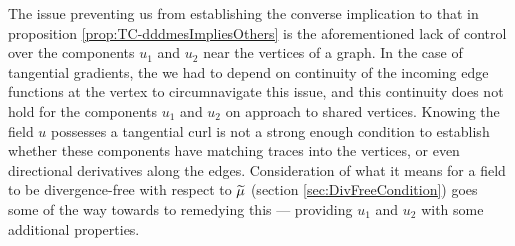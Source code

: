 The issue preventing us from establishing the converse implication to that in proposition \ref{prop:TC-dddmesImpliesOthers} is the aforementioned lack of control over the components $u_1$ and $u_2$ near the vertices of a graph.
In the case of tangential gradients, the we had to depend on continuity of the incoming edge functions at the vertex to circumnavigate this issue, and this continuity does not hold for the components $u_1$ and $u_2$ on approach to shared vertices.
Knowing the field $u$ possesses a tangential curl is not a strong enough condition to establish whether these components have matching traces into the vertices, or even directional derivatives along the edges.
Consideration of what it means for a field to be divergence-free with respect to $\widetilde{\mu}$ (section \ref{sec:DivFreeCondition}) goes some of the way towards to remedying this --- providing $u_1$ and $u_2$ with some additional properties.
